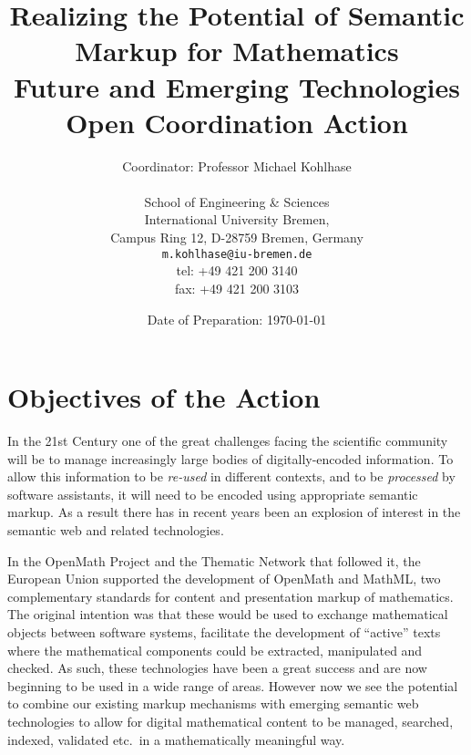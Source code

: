 \documentclass[draft]{artikel3}
\begin{document}
\title{Realizing the Potential of Semantic  Markup for Mathematics\\
  \normalfont\large Future and Emerging Technologies Open Coordination
  Action}
\date{Date of Preparation: \today} 
\author{\normalfont\large  Coordinator: Professor Michael Kohlhase\\
  \parbox[t]{.5\textwidth}{
    \normalfont\normalsize School of Engineering \& Sciences\\
    \normalfont\normalsize International University Bremen, \\
    \normalfont\normalsize Campus Ring 12, D-28759 Bremen, Germany}
\hfill
 \parbox[t]{.5\textwidth}{\raggedleft
  \normalfont\normalsize \texttt{m.kohlhase@iu-bremen.de}\\
\normalfont\normalsize tel: +49 421 200 3140\\
\normalfont\normalsize fax: +49 421 200 3103}
}


\titlepage 

\maketitle
\showednotestrue

\section{Objectives of the Action}

In the 21st Century one of the great challenges facing the scientific
community will be to manage increasingly large bodies of
digitally-encoded information.  To allow this information to be
\emph{re-used} in different contexts, and to be \emph{processed} by
software assistants, it will need to be encoded using appropriate
semantic markup.  As a result there has in recent years been an
explosion of interest in the semantic web and related technologies.

In the OpenMath Project and the Thematic Network that followed it, the
European Union supported the development of OpenMath and MathML, two
complementary standards for content and presentation markup of
mathematics.  The original intention was that these would be used to
exchange mathematical objects between software systems, facilitate the
development of ``active'' texts where the mathematical components
could be extracted, manipulated and checked.  As such, these
technologies have been a great success and are now beginning to be
used in a wide range of areas.  However now we see the potential to
combine our existing markup mechanisms with emerging semantic web
technologies to allow for digital mathematical content to be managed,
searched, indexed, validated etc.~in a mathematically meaningful way.
\end{document}

